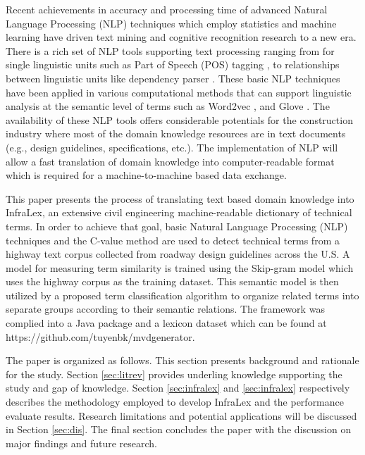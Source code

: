 \documentclass[Journal, InsideFigs, DoubleSpace]{ascelike} %
\begin{document}
Recent achievements in accuracy and processing time of advanced Natural Language Processing (NLP) techniques which employ statistics and machine learning have driven text mining and cognitive recognition research to a new era. There is a rich set of NLP tools supporting text processing ranging from for single linguistic units such as Part of Speech (POS) tagging \cite{Toutanova03,Cunningham02}, to relationships between linguistic units like dependency parser \cite{chen14}. These basic NLP techniques have been applied in various computational methods that can support linguistic analysis at the semantic level of terms such as Word2vec \cite{mikolov13a}, and Glove \cite{pennington2014glove}. The availability of these NLP tools offers considerable potentials for the construction industry where most of the domain knowledge resources are in text documents (e.g., design guidelines, specifications, etc.). The implementation of NLP will allow a fast translation of domain knowledge into computer-readable format which is required for a machine-to-machine based data exchange.
\par
This paper presents the process of translating text based domain knowledge into InfraLex, an extensive civil engineering machine-readable dictionary of technical terms. In order to achieve that goal, basic Natural Language Processing (NLP) techniques and the C-value method \cite{frantzi20} are used to detect technical terms from a highway text corpus collected from roadway design guidelines across the U.S. A model for measuring term similarity is trained using the Skip-gram model \cite{mikolov13a} which uses the highway corpus as the training dataset. This semantic model is then utilized by a proposed term classification algorithm to organize related terms into separate groups according to their semantic relations. The framework was complied into a Java package and a lexicon dataset which can be found at https://github.com/tuyenbk/mvdgenerator.
%
\par
The paper is organized as follows. This section presents background and rationale for the study. Section \ref{sec:litrev} provides underling knowledge supporting the study and gap of knowledge. Section \ref{sec:infralex} and \ref{sec:infralex} respectively describes the methodology employed to develop InfraLex and the performance evaluate results. Research limitations and potential applications will be discussed in Section \ref{sec:dis}. The final section concludes the paper with the discussion on major findings and future research.
% 
\end{document}
